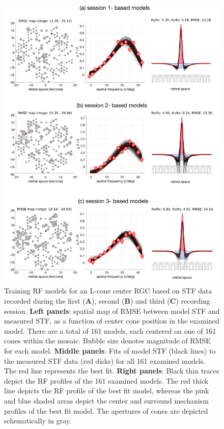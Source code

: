 \documentclass[11pt, oneside]{article}   	%
\begin{document}
\begin{figure}[htbp] %
   \centering
   \includegraphics[width=6in]{Figures/CrossValidationMethod_TrainingModels.pdf} 
   \caption{Training RF models for an L-cone center RGC based on STF data recorded during the first (\textbf{A}), second (\textbf{B}) and third (\textbf{C}) recording session. \textbf{Left panels}: spatial map of RMSE between model STF and measured STF, as a function of center cone position in the examined model. There are a total of 161 models, each centered on one of 161 cones within the mosaic. Bubble size denotes magnitude of RMSE for each model. \textbf{Middle panels}: Fits of model STF (black lines) to the measured STF data (red disks) for all 161 examined models. The red line represents the best fit. \textbf{Right panels}: Black thin traces depict the RF profiles of the 161 examined models. The red thick line depicts the RF profile of the best fit model, whereas the pink and blue shaded areas depict the center and surround mechanism profiles of the best fit model. The apertures of cones are depicted schematically in gray.}
   \label{fig:CrossValidationApproach_TrainingModels}
\end{figure}
\end{document}
